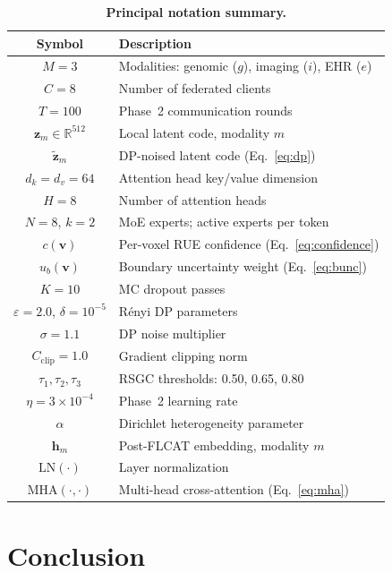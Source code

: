 \documentclass[a4paper,fleqn]{cas-dc}
\begin{document}
\begin{table}[!t]
\caption{\textbf{Principal notation summary.}}

\centering
\renewcommand{\arraystretch}{1.15}
\setlength{\tabcolsep}{4pt}
\begin{tabular}{cl}
\toprule
\textbf{Symbol} & \textbf{Description}\\
\midrule
$M\!=\!3$ & Modalities: genomic ($g$), imaging ($i$), EHR ($e$)\\
$C\!=\!8$ & Number of federated clients\\
$T\!=\!100$ & Phase~2 communication rounds\\
$\mathbf{z}_m \in \mathbb{R}^{512}$ & Local latent code, modality $m$\\
$\tilde{\mathbf{z}}_m$ & DP-noised latent code (Eq.~\ref{eq:dp})\\
$d_k\!=\!d_v\!=\!64$ & Attention head key/value dimension\\
$H\!=\!8$ & Number of attention heads\\
$N\!=\!8$, $k\!=\!2$ & MoE experts; active experts per token\\
$c(\mathbf{v})$ & Per-voxel RUE confidence (Eq.~\ref{eq:confidence})\\
$u_b(\mathbf{v})$ & Boundary uncertainty weight (Eq.~\ref{eq:bunc})\\
$K\!=\!10$ & MC dropout passes\\
$\varepsilon\!=\!2.0$, $\delta\!=\!10^{-5}$ & R\'{e}nyi DP parameters\\
$\sigma\!=\!1.1$ & DP noise multiplier\\
$C_{\mathrm{clip}}\!=\!1.0$ & Gradient clipping norm\\
$\tau_1,\tau_2,\tau_3$ & RSGC thresholds: 0.50, 0.65, 0.80\\
$\eta\!=\!3\!\times\!10^{-4}$ & Phase~2 learning rate\\
$\alpha$ & Dirichlet heterogeneity parameter\\
$\mathbf{h}_m$ & Post-FLCAT embedding, modality $m$\\
$\mathrm{LN}(\cdot)$ & Layer normalization\\
$\mathrm{MHA}(\cdot,\cdot)$ & Multi-head cross-attention (Eq.~\ref{eq:mha})\\
\bottomrule
\end{tabular}
\end{table}

\section{Conclusion}
\label{sec:conclusion}
\end{document}
